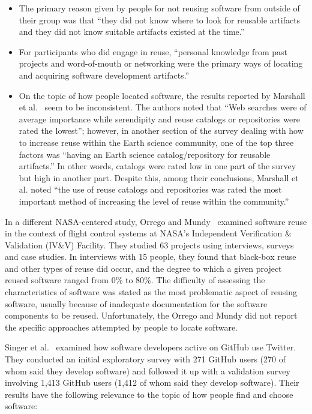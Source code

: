 \documentclass{casicswhitepaper}
\begin{document}
\begin{itemize}

\item The primary reason given by people for not reusing software from outside of their group was that ``they did not know where to look for reusable artifacts and they did not know suitable artifacts existed at the time.''

\item For participants who did engage in reuse, ``personal knowledge from past projects and word-of-mouth or networking were the primary ways of locating and acquiring software development artifacts.''  

\item On the topic of how people located software, the results reported by Marshall et al.~\cite{marshall2006software} seem to be inconsistent.  The authors noted that ``Web searches were of average importance while serendipity and reuse catalogs or repositories were rated the lowest''; however, in another section of the survey dealing with how to increase reuse within the Earth science community, one of the top three factors was ``having an Earth science catalog/repository for reusable artifacts.''  In other words, catalogs were rated low in one part of the survey but high in another part.  Despite this, among their conclusions, Marshall et al. noted ``the use of reuse catalogs and repositories was rated the most important method of increasing the level of reuse within the community.''

\end{itemize}

In a different NASA-centered study, Orrego and Mundy~\cite{orrego_2007_study} examined software reuse in the context of flight control systems at NASA's Independent Verification \& Validation (IV\&V) Facility.  They studied 63 projects using interviews, surveys and case studies.  In interviews with 15 people, they found that black-box reuse and other types of reuse did occur, and the degree to which a given project reused software ranged from 0\% to 80\%.  The difficulty of assessing the characteristics of software was stated as the most problematic aspect of reusing software, usually because of inadequate documentation for the software components to be reused.  Unfortunately, the Orrego and Mundy did not report the specific approaches attempted by people to locate software.

Singer et al.~\cite{singer2014software} examined how software developers active on GitHub use Twitter.  They conducted an initial exploratory survey with 271 GitHub users (270 of whom said they develop software) and followed it up with a validation survey involving 1,413 GitHub users (1,412 of whom said they develop software).  Their results have the following relevance to the topic of how people find and choose software:
\end{document}
